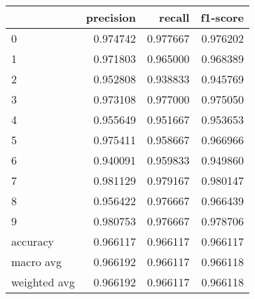 \begin{tabular}{lrrr}
\toprule
 & precision & recall & f1-score \\
\midrule
0 & 0.974742 & 0.977667 & 0.976202 \\
1 & 0.971803 & 0.965000 & 0.968389 \\
2 & 0.952808 & 0.938833 & 0.945769 \\
3 & 0.973108 & 0.977000 & 0.975050 \\
4 & 0.955649 & 0.951667 & 0.953653 \\
5 & 0.975411 & 0.958667 & 0.966966 \\
6 & 0.940091 & 0.959833 & 0.949860 \\
7 & 0.981129 & 0.979167 & 0.980147 \\
8 & 0.956422 & 0.976667 & 0.966439 \\
9 & 0.980753 & 0.976667 & 0.978706 \\
accuracy & 0.966117 & 0.966117 & 0.966117 \\
macro avg & 0.966192 & 0.966117 & 0.966118 \\
weighted avg & 0.966192 & 0.966117 & 0.966118 \\
\bottomrule
\end{tabular}
